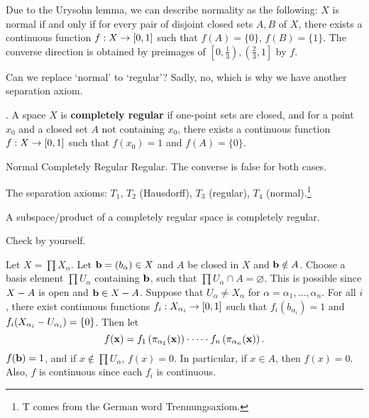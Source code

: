 \rmk Due to the Urysohn lemma, we can describe normality as the following: \(X\) is normal if and only if for every pair of disjoint closed sets \(A, B\) of \(X\), there exists a continuous function \(f : X \ra [0, 1]\) such that \(f(A) = \{0\}\), \(f(B) = \{1\}\). The converse direction is obtained by preimages of \(\left[0, \frac{1}{3}\right), \left(\frac{2}{3}, 1\right]\) by \(f\).

Can we replace `normal' to `regular'? Sadly, no, which is why we have another separation axiom.

.  A space \(X\) is \textbf{completely regular} if one-point sets are closed, and for a point \(x_0\) and a closed set \(A\) not containing \(x_0\), there exists a continuous function \(f: X \ra [0, 1]\) such that \(f(x_0) = 1\) and \(f(A) = \{0\}\).

\rmk Normal \mimp Completely Regular \mimp Regular. The converse is false for both cases.

\rmk The separation axioms: \(T_1\), \(T_2\) (Hausdorff), \(T_3\) (regular), \(T_4\) (normal).\footnote{T comes from the German word Trennungsaxiom.}

 A subspace/product of a completely regular space is completely regular.

\pf {} Check by yourself.

 Let \(X = \prod X_\alpha\). Let \(\bf{b} = (b_\alpha) \in X\) and \(A\) be closed in \(X\) and \(\bf{b} \notin A\). Choose a basis element \(\prod U_\alpha\) containing \(\bf{b}\), such that \(\prod U_\alpha \cap A = \varnothing\). This is possible since \(X \bs A\) is open and \(\bf{b} \in X \bs A\). Suppose that \(U_\alpha \neq X_\alpha\) for \(\alpha = \alpha_1, \dots, \alpha_n\). For all \(i\), there exist continuous functions \(f_i: X_{\alpha_i} \ra [0, 1]\) such that \(f_i(b_{\alpha_i}) = 1\) and \(f_i(X_{\alpha_i} \bs U_{\alpha_i}) = \{0\}\). Then let
\[
    f(\bf{x}) = f_1 \paren{\pi_{\alpha_1} (\bf{x})} \cdot \cdots \cdot f_n \paren{\pi_{\alpha_n} (\bf{x})}.
\]
\(f(\bf{b}) = 1\), and if \(x \notin \prod U_\alpha\), \(f(x) = 0\). In particular, if \(x \in A\), then \(f(x) = 0\). Also, \(f\) is continuous since each \(f_i\) is continuous.

\pagebreak
